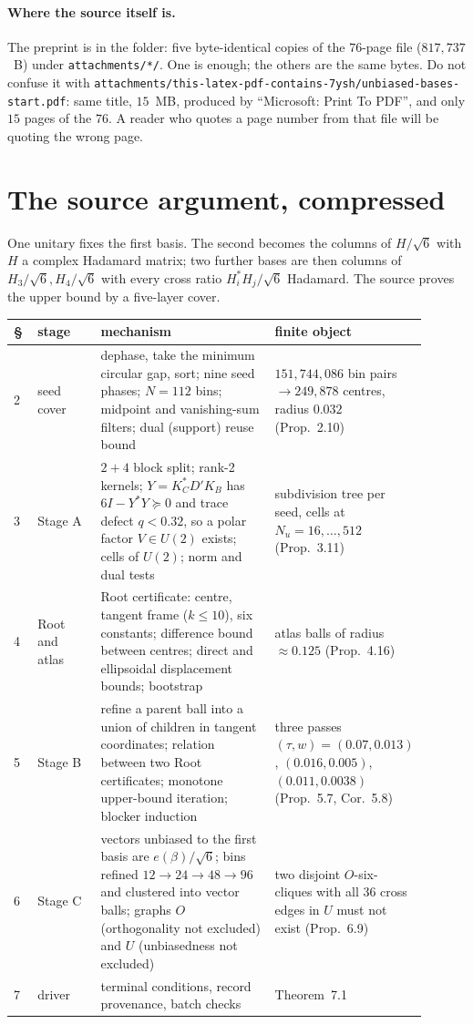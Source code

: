 \documentclass[10pt]{article}
\theoremstyle{definition}
\newcommand{\file}[1]{\texttt{\small #1}}
\begin{document}
\paragraph{Where the source itself is.} The preprint is in the folder: five byte-identical copies of the
$76$-page file ($817{,}737$~B) under \file{attachments/*/}. One is enough; the others are the same bytes.
Do not confuse it with \file{attachments/this-latex-pdf-contains-7ysh/unbiased-bases-start.pdf}: same title,
$15$~MB, produced by ``Microsoft: Print To PDF'', and only $15$ pages of the $76$. A reader who quotes a
page number from that file will be quoting the wrong page.

\section{The source argument, compressed}

One unitary fixes the first basis. The second becomes the columns of $H/\sqrt6$ with $H$ a complex
Hadamard matrix; two further bases are then columns of $H_3/\sqrt6,H_4/\sqrt6$ with every cross ratio
$H_i^*H_j/\sqrt6$ Hadamard. The source proves the upper bound by a five-layer cover.

\begin{center}
\small
\begin{tabular}{@{}p{0.06\linewidth}p{0.17\linewidth}p{0.47\linewidth}p{0.20\linewidth}@{}}
\toprule
\S & stage & mechanism & finite object \\
\midrule
2 & seed cover & dephase, take the minimum circular gap, sort; nine seed phases; $N=112$ bins;
midpoint and vanishing-sum filters; dual (support) reuse bound & $151{,}744{,}086$ bin pairs
$\to249{,}878$ centres, radius $0.032$ (Prop.~2.10) \\
3 & Stage A & $2+4$ block split; rank-2 kernels; $Y=K_C^*D'K_B$ has $6I-Y^*Y\succeq0$ and trace
defect $q<0.32$, so a polar factor $V\in U(2)$ exists; cells of $U(2)$; norm and dual tests &
subdivision tree per seed, cells at $N_u=16,\dots,512$ (Prop.~3.11) \\
4 & Root and atlas & Root certificate: centre, tangent frame ($k\le10$), six constants; difference
bound between centres; direct and ellipsoidal displacement bounds; bootstrap & atlas balls of
radius $\approx0.125$ (Prop.~4.16) \\
5 & Stage B & refine a parent ball into a union of children in tangent coordinates; relation between
two Root certificates; monotone upper-bound iteration; blocker induction & three passes
$(\tau,w)=(0.07,0.013)$, $(0.016,0.005)$, $(0.011,0.0038)$ (Prop.~5.7, Cor.~5.8) \\
6 & Stage C & vectors unbiased to the first basis are $e(\beta)/\sqrt6$; bins refined
$12\to24\to48\to96$ and clustered into vector balls; graphs $O$ (orthogonality not excluded) and $U$
(unbiasedness not excluded) & two disjoint $O$-six-cliques with all $36$ cross edges in $U$ must
not exist (Prop.~6.9) \\
7 & driver & terminal conditions, record provenance, batch checks & Theorem~7.1 \\
\bottomrule
\end{tabular}
\end{center}
\end{document}
